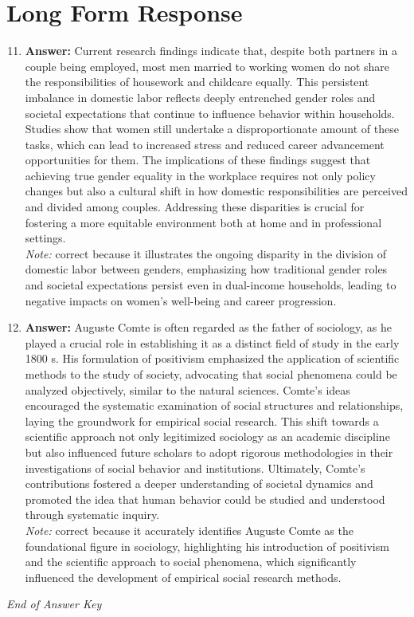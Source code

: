 \documentclass[12pt]{article}
\begin{document}
\section*{Long Form Response}
\begin{enumerate}[label=\arabic*.]
\setcounter{enumi}{10}
\item \textbf{Answer:} Current research findings indicate that, despite both partners in a couple being employed, most men married to working women do not share the responsibilities of housework and childcare equally. This persistent imbalance in domestic labor reflects deeply entrenched gender roles and societal expectations that continue to influence behavior within households. Studies show that women still undertake a disproportionate amount of these tasks, which can lead to increased stress and reduced career advancement opportunities for them. The implications of these findings suggest that achieving true gender equality in the workplace requires not only policy changes but also a cultural shift in how domestic responsibilities are perceived and divided among couples. Addressing these disparities is crucial for fostering a more equitable environment both at home and in professional settings.
\\ \textit{Note:} correct because it illustrates the ongoing disparity in the division of domestic labor between genders, emphasizing how traditional gender roles and societal expectations persist even in dual-income households, leading to negative impacts on women's well-being and career progression.
\item \textbf{Answer:} Auguste Comte is often regarded as the father of sociology, as he played a crucial role in establishing it as a distinct field of study in the early 1800 s. His formulation of positivism emphasized the application of scientific methods to the study of society, advocating that social phenomena could be analyzed objectively, similar to the natural sciences. Comte's ideas encouraged the systematic examination of social structures and relationships, laying the groundwork for empirical social research. This shift towards a scientific approach not only legitimized sociology as an academic discipline but also influenced future scholars to adopt rigorous methodologies in their investigations of social behavior and institutions. Ultimately, Comte's contributions fostered a deeper understanding of societal dynamics and promoted the idea that human behavior could be studied and understood through systematic inquiry.
\\ \textit{Note:} correct because it accurately identifies Auguste Comte as the foundational figure in sociology, highlighting his introduction of positivism and the scientific approach to social phenomena, which significantly influenced the development of empirical social research methods.
\end{enumerate}

\vfill
\noindent\textit{End of Answer Key}
\end{document}
